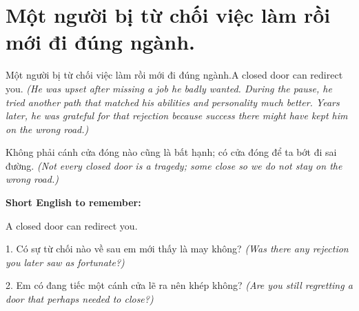 \section{Một người bị từ chối việc làm rồi mới đi đúng ngành.}
\begin{truyen}{Một người bị từ chối việc làm rồi mới đi đúng ngành.}{A closed door can redirect you.}
\textit{(He was upset after missing a job he badly wanted. During the pause, he tried another path that matched his abilities and personality much better. Years later, he was grateful for that rejection because success there might have kept him on the wrong road.)}
\end{truyen}
\begin{baihoc}
Không phải cánh cửa đóng nào cũng là bất hạnh; có cửa đóng để ta bớt đi sai đường.
\textit{(Not every closed door is a tragedy; some close so we do not stay on the wrong road.)}
\end{baihoc}
\begin{ghinhoanh}\textbf{Short English to remember:}

A closed door can redirect you.
\end{ghinhoanh}
\begin{tuhocnhanh}
1. Có sự từ chối nào về sau em mới thấy là may không? \textit{(Was there any rejection you later saw as fortunate?)}

2. Em có đang tiếc một cánh cửa lẽ ra nên khép không? \textit{(Are you still regretting a door that perhaps needed to close?)}
\end{tuhocnhanh}
\ngancach

